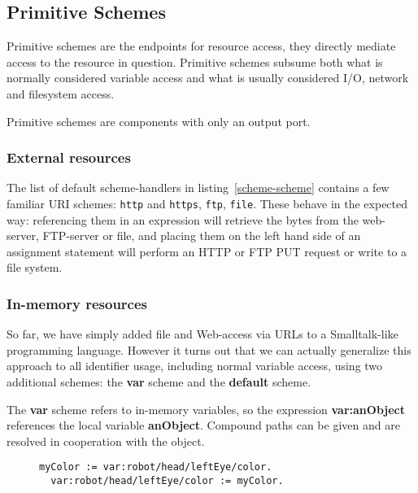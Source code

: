 \documentclass[preprint,authoryear]{acm_proc_article-sp}
\begin{document}
\subsection{Primitive Schemes}
\label{primitiveSchemes}

Primitive schemes are the endpoints for resource access, they directly
mediate access to the resource in question.  Primitive schemes
subsume both what is normally considered variable access and 
what is usually considered I/O, network and filesystem access.

Primitive schemes are components with only an output port.

\subsubsection{External resources}
\label{externalResources}

The list of default scheme-handlers in listing~\ref{scheme-scheme} contains a few familiar URI schemes:
{\tt http} and {\tt https}, {\tt ftp}, {\tt file}.   These behave in the expected way:   referencing them in an expression will
retrieve the bytes from the web-server, FTP-server or file, and placing them on the left hand side of
an assignment statement will perform an HTTP or FTP PUT request or write to a file system.



\subsubsection{In-memory resources}
\label{inmemory}

So far, we have simply added file and Web-access via URLs to a 
Smalltalk-like programming language.  However it turns out that we can actually generalize
this approach to all identifier usage, including normal variable access, using
two additional schemes:  the {\bf var} scheme and the {\bf default} scheme.

The {\bf var} scheme refers to in-memory variables, so the expression
 {\bf var:anObject} references the
local variable {\bf anObject}.   Compound paths can be given and are resolved in
cooperation with the object.


\begin{figure}[htbp]
\begin{lstlisting}[style=L,label=in-memory-path,caption=In-memory access path.]
  myColor := var:robot/head/leftEye/color.
  var:robot/head/leftEye/color := myColor.
\end{lstlisting}
\end{figure}
\end{document}

